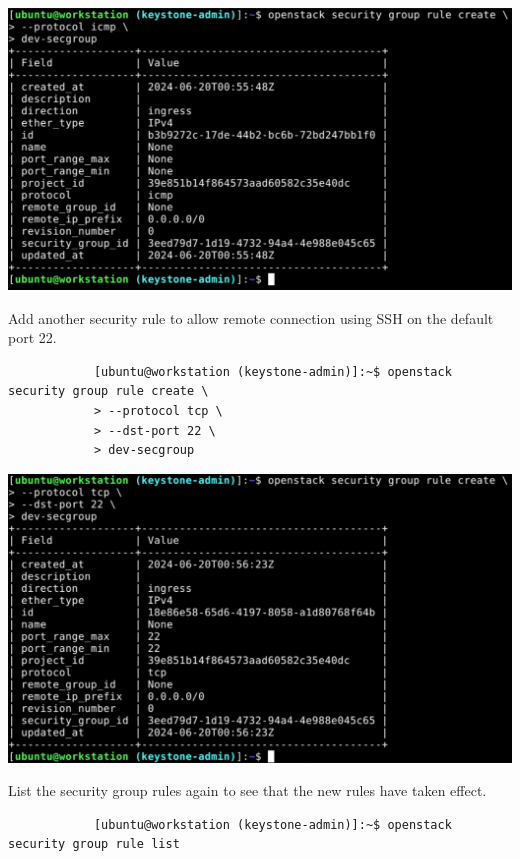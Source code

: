 \documentclass[letterpaper, 12pt]{article}
\begin{document}
\begin{enumerate}
\begin{labstep}
        \begin{center}
            \includegraphics[width=\linewidth]{images/part1/step27.png}
        \end{center}
    \end{labstep}

    \begin{labstep}
        Add another security rule to allow remote connection using SSH on the default port 22.
        \begin{lstlisting}
            [ubuntu@workstation (keystone-admin)]:~$ openstack security group rule create \
            > --protocol tcp \
            > --dst-port 22 \
            > dev-secgroup
        \end{lstlisting}

        \begin{center}
            \includegraphics[width=\linewidth]{images/part1/step28.png}
        \end{center}
    \end{labstep}

    \begin{labstep}
        List the security group rules again to see that the new rules have taken effect.
        \begin{lstlisting}
            [ubuntu@workstation (keystone-admin)]:~$ openstack security group rule list
        \end{lstlisting}


\end{labstep}
\end{enumerate}
\end{document}
